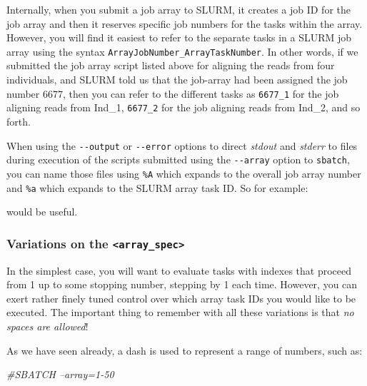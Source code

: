 \documentclass[]{krantz}
\makeatletter
\newenvironment{Shaded}{\begin{snugshade}}{\end{snugshade}}
\newcommand{\CommentTok}[1]{\textcolor[rgb]{0.37,0.37,0.37}{\textit{#1}}}
\newenvironment{kframe}{%
\medskip{}
\setlength{\fboxsep}{.8em}
 \def\at@end@of@kframe{}%
 \ifinner\ifhmode%
  \def\at@end@of@kframe{\end{minipage}}%
  \begin{minipage}{\columnwidth}%
 \fi\fi%
 \def\FrameCommand##1{\hskip\@totalleftmargin \hskip-\fboxsep
 \colorbox{shadecolor}{##1}\hskip-\fboxsep
     \hskip-\linewidth \hskip-\@totalleftmargin \hskip\columnwidth}%
 \MakeFramed {\advance\hsize-\width
   \@totalleftmargin\z@ \linewidth\hsize
   \@setminipage}}%
 {\par\unskip\endMakeFramed%
 \at@end@of@kframe}
\renewenvironment{Shaded}{\begin{kframe}}{\end{kframe}}
\makeatother
\begin{document}
Internally, when you submit a job array to SLURM, it creates a job ID for the
job array and then it reserves specific job numbers for the tasks within the array. However,
you will find it easiest to refer to the separate tasks in a SLURM job array using the
syntax \texttt{ArrayJobNumber\_ArrayTaskNumber}. In other words, if we submitted the
job array script listed above for aligning the reads from four individuals, and SLURM
told us that the job-array had been assigned the job number 6677, then you can
refer to the different tasks as \texttt{6677\_1} for the job aligning reads from Ind\_1,
\texttt{6677\_2} for the job aligning reads from Ind\_2, and so forth.

When using the \texttt{-\/-output} or \texttt{-\/-error} options to direct \emph{stdout} and \emph{stderr} to
files during execution of the scripts submitted using the \texttt{-\/-array} option to \texttt{sbatch}, you
can name those files using \texttt{\%A} which expands to the overall job array number and
\texttt{\%a} which expands to the SLURM array task ID. So for example:

\begin{Shaded}
\end{Shaded}

would be useful.

\hypertarget{variations-on-the-array_spec}{%
\subsubsection{\texorpdfstring{Variations on the \texttt{\textless{}array\_spec\textgreater{}}}{Variations on the \textless{}array\_spec\textgreater{}}}\label{variations-on-the-array_spec}}

In the simplest case, you will want to evaluate tasks with indexes that
proceed from 1 up to some stopping number, stepping by 1 each time. However,
you can exert rather finely tuned control over which array task IDs you would like to
be executed. The important thing to remember with all these variations is that
\emph{no spaces are allowed}!

As we have seen already, a dash is used to represent a range of numbers, such as:

\begin{Shaded}
\begin{Highlighting}[]
\CommentTok{#SBATCH --array=1-50}
\end{Highlighting}
\end{Shaded}
\end{document}
